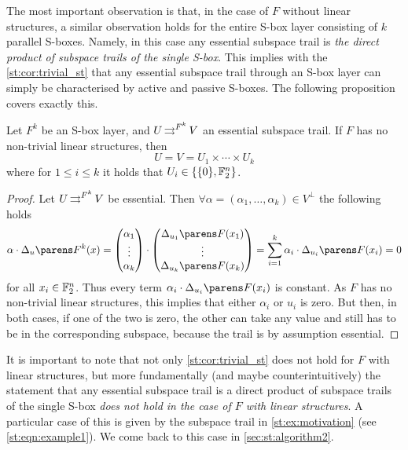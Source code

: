The most important observation is that, in the case of $F$ without linear structures, a similar observation holds for the entire S-box layer consisting of $k$ parallel S-boxes.
Namely, in this case any essential subspace trail is \emph{the direct product of subspace trails of the single S-box}.
This implies with the \cref{st:cor:trivial_st} that any essential subspace trail through an S-box layer can simply be characterised by active and passive S-boxes.
The following proposition covers exactly this.
\begin{proposition}\label{st:prop:no_ls}
    Let $F^k$ be an S-box layer, and $U \operatorname*{\rightrightarrows}^{F^k}_{} V$ an essential subspace trail.
    If $F$ has no non-trivial linear structures, then
    \begin{equation*}
        U = V = U_1 \times \cdots \times U_k
    \end{equation*}
    where for $1 \leqslant i \leqslant k$ it holds that $U_i \in \{ \{0\}, \mathbb{F}_2^n\}$.
\end{proposition}
\begin{proof}
    Let $U \operatorname*{\rightrightarrows}^{F^k}_{} V$ be essential.
    Then $\forall \alpha = (\alpha_1, \ldots, \alpha_k) \in V^\perp$ the following holds
    \begin{align*}
        \iprod{\alpha}{\derive{u}{F^k}(x)}
        = \iprod{\begin{pmatrix}\alpha_1 \\ \vdots \\ \alpha_k\end{pmatrix}}{\begin{pmatrix} \derive{u_1}{F}(x_1) \\ \vdots \\ \derive{u_k}{F}(x_k)\end{pmatrix}}
        = \sum_{i=1}^k \iprod{\alpha_i}{\derive{u_i}{F}(x_i)} = 0
    \end{align*}
    for all $x_i \in \mathbb{F}_2^n$.
    Thus every term $\iprod{\alpha_i}{\derive{u_i}{F}(x_i)}$ is constant.
    As $F$ has no non-trivial linear structures, this implies that either $\alpha_i$ or $u_i$ is zero.
    But then, in both cases, if one of the two is zero, the other can take any value and still has to be in the corresponding subspace, because the trail is by assumption essential.
\end{proof}
It is important to note that not only \cref{st:cor:trivial_st} does not hold for $F$ with linear structures, but more fundamentally (and maybe counterintuitively) the statement that any essential subspace trail is a direct product of subspace trails of the single S-box \emph{does not hold in the case of $F$ with linear structures}.
A particular case of this is given by the subspace trail in \cref{st:ex:motivation} (see \cref{st:eqn:example1}).
We come back to this case in \cref{sec:st:algorithm2}.

